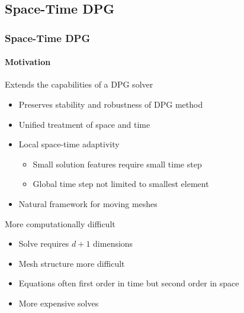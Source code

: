 \documentclass[18pt,xcolor=table]{beamer}
\begin{document}
\subsection{Space-Time DPG}


\begin{frame}[t]
\frametitle{Space-Time DPG}
\framesubtitle{Motivation}
Extends the capabilities of a DPG solver
\begin{itemize}
  \item Preserves stability and robustness of DPG method
  \item Unified treatment of space and time
  \item Local space-time adaptivity
  \begin{itemize}
    \item Small solution features require small time step
    \item Global time step not limited to smallest element
  \end{itemize}
  \item Natural framework for moving meshes
\end{itemize}
\bigskip

More computationally difficult
\begin{itemize}
  \item Solve requires $d+1$ dimensions
  \item Mesh structure more difficult
  \item Equations often first order in time but second order in space
  \item More expensive solves
\end{itemize}
\end{frame}
\end{document}
